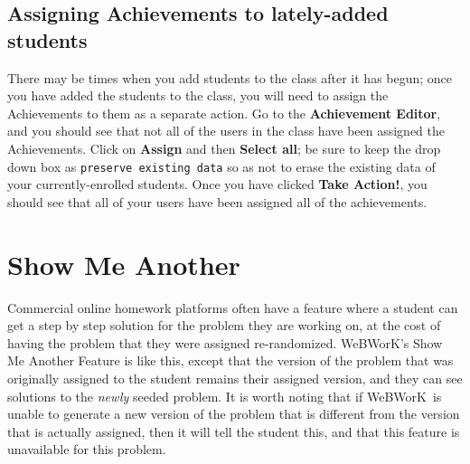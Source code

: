 \documentclass[12pt]{article}
\newcommand{\menu}[1]{\textbf{#1}}
\newcommand{\WW}{WeBWorK}
\begin{document}
\subsection{Assigning Achievements to lately-added students}\label{achievementslateaddstudents}
There may be times when you add students to the class after it has begun; once you have added the students to the class, you will need to assign the Achievements to them as a separate action. Go to the \menu{Achievement Editor}, and you should see that not all of the users in the class have been assigned the Achievements. Click on \menu{Assign} and then \menu{Select all}; be sure to keep the drop down box as \texttt{preserve existing data} so as not to erase the existing data of your currently-enrolled students. Once you have clicked \menu{Take Action!}, you should see that all of your users have been assigned all of the achievements.

\section{Show Me Another}\label{SMA}

Commercial online homework platforms often have a feature where a student can get a step by step solution for the problem they are working on, at the cost of having the problem that they were assigned re-randomized. \WW's Show Me Another Feature is like this, except that the version of the problem that was originally assigned to the student remains their assigned version, and they can see solutions to the \emph{newly} seeded problem. It is worth noting that if \WW\ is unable to generate a new version of the problem that is different from the version that is actually assigned, then it will tell the student this, and that this feature is unavailable for this problem.
\end{document}
